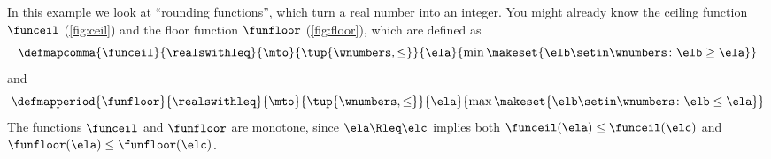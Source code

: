 \begin{example}
    \label{ex:rounding-functions}
    In this example we look at ``rounding functions'', which turn a real number into an integer.
    You might already know the ceiling function $\funceil$ (\cref{fig:ceil}) and the floor function $\funfloor$ (\cref{fig:floor}), which are defined as
    \begin{equation}\label{eq:funceil}
        \defmapcomma{
            \funceil
        }{
            \realswithleq
        }{
            \mto
        }{
            \tup{\wnumbers, \leq}
        }{
            \ela
        }{
            \min \makeset{\elb \setin \wnumbers \colon \elb \geq \ela }
        }
    \end{equation}
    and
    \begin{equation}\label{eq:funfloor}
        \defmapperiod{
            \funfloor
        }{
            \realswithleq
        }{
            \mto
        }{
            \tup{\wnumbers, \leq}
        }{
            \ela
        }{
            \max \makeset{\elb \setin \wnumbers \colon \elb \leq \ela }
        }
    \end{equation}
    The functions $\funceil$ and $\funfloor$ are monotone, since $\ela \Rleq \elc$ implies both $\funceil(\ela) \leq \funceil(\elc)$ and $\funfloor(\ela) \leq \funfloor(\elc)$.


\end{example}
